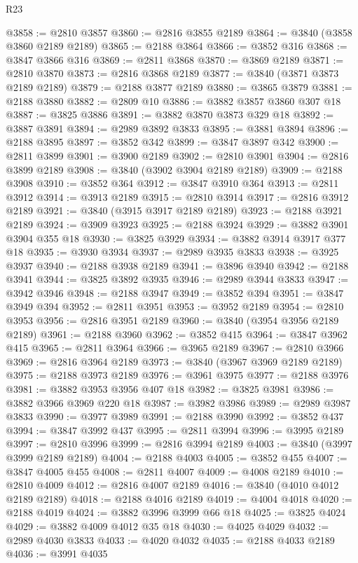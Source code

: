 \begin{lexlean}{R23}
\begin{coremodule}
@3858 := @2810 @3857
@3860 := @2816 @3855 @2189
@3864 := @3840 (@3858 @3860 @2189 @2189)
@3865 := @2188 @3864
@3866 := @3852 @316
@3868 := @3847 @3866 @316
@3869 := @2811 @3868
@3870 := @3869 @2189
@3871 := @2810 @3870
@3873 := @2816 @3868 @2189
@3877 := @3840 (@3871 @3873 @2189 @2189)
@3879 := @2188 @3877 @2189
@3880 := @3865 @3879
@3881 := @2188 @3880
@3882 := @2809 @10
@3886 := @3882 @3857 @3860 @307 @18
@3887 := @3825 @3886
@3891 := @3882 @3870 @3873 @329 @18
@3892 := @3887 @3891
@3894 := @2989 @3892 @3833
@3895 := @3881 @3894
@3896 := @2188 @3895
@3897 := @3852 @342
@3899 := @3847 @3897 @342
@3900 := @2811 @3899
@3901 := @3900 @2189
@3902 := @2810 @3901
@3904 := @2816 @3899 @2189
@3908 := @3840 (@3902 @3904 @2189 @2189)
@3909 := @2188 @3908
@3910 := @3852 @364
@3912 := @3847 @3910 @364
@3913 := @2811 @3912
@3914 := @3913 @2189
@3915 := @2810 @3914
@3917 := @2816 @3912 @2189
@3921 := @3840 (@3915 @3917 @2189 @2189)
@3923 := @2188 @3921 @2189
@3924 := @3909 @3923
@3925 := @2188 @3924
@3929 := @3882 @3901 @3904 @355 @18
@3930 := @3825 @3929
@3934 := @3882 @3914 @3917 @377 @18
@3935 := @3930 @3934
@3937 := @2989 @3935 @3833
@3938 := @3925 @3937
@3940 := @2188 @3938 @2189
@3941 := @3896 @3940
@3942 := @2188 @3941
@3944 := @3825 @3892 @3935
@3946 := @2989 @3944 @3833
@3947 := @3942 @3946
@3948 := @2188 @3947
@3949 := @3852 @394
@3951 := @3847 @3949 @394
@3952 := @2811 @3951
@3953 := @3952 @2189
@3954 := @2810 @3953
@3956 := @2816 @3951 @2189
@3960 := @3840 (@3954 @3956 @2189 @2189)
@3961 := @2188 @3960
@3962 := @3852 @415
@3964 := @3847 @3962 @415
@3965 := @2811 @3964
@3966 := @3965 @2189
@3967 := @2810 @3966
@3969 := @2816 @3964 @2189
@3973 := @3840 (@3967 @3969 @2189 @2189)
@3975 := @2188 @3973 @2189
@3976 := @3961 @3975
@3977 := @2188 @3976
@3981 := @3882 @3953 @3956 @407 @18
@3982 := @3825 @3981
@3986 := @3882 @3966 @3969 @220 @18
@3987 := @3982 @3986
@3989 := @2989 @3987 @3833
@3990 := @3977 @3989
@3991 := @2188 @3990
@3992 := @3852 @437
@3994 := @3847 @3992 @437
@3995 := @2811 @3994
@3996 := @3995 @2189
@3997 := @2810 @3996
@3999 := @2816 @3994 @2189
@4003 := @3840 (@3997 @3999 @2189 @2189)
@4004 := @2188 @4003
@4005 := @3852 @455
@4007 := @3847 @4005 @455
@4008 := @2811 @4007
@4009 := @4008 @2189
@4010 := @2810 @4009
@4012 := @2816 @4007 @2189
@4016 := @3840 (@4010 @4012 @2189 @2189)
@4018 := @2188 @4016 @2189
@4019 := @4004 @4018
@4020 := @2188 @4019
@4024 := @3882 @3996 @3999 @66 @18
@4025 := @3825 @4024
@4029 := @3882 @4009 @4012 @35 @18
@4030 := @4025 @4029
@4032 := @2989 @4030 @3833
@4033 := @4020 @4032
@4035 := @2188 @4033 @2189
@4036 := @3991 @4035

\end{coremodule}
\end{lexlean}
